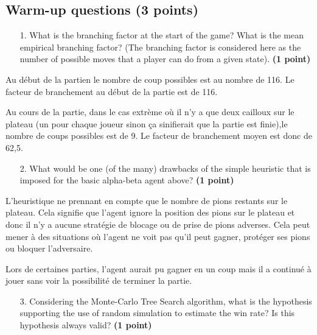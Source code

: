 \documentclass[11pt,a4paper]{report}
\begin{document}
\subsection{Warm-up questions (3 points)}
\begin{enumerate}
\item[1.] What is the branching factor at the start of the game? What is the mean empirical branching factor? (The branching factor is considered here as the number of possible moves that a player can do from a given state). \textbf{(1 point)}
\end{enumerate}

\begin{answers}[5cm]
Au début de la partien le nombre de coup possibles est au nombre de 116. Le facteur de branchement au début de la partie est de 116.

Au cours de la partie, dans le cas extrème où il n'y a que deux cailloux sur le plateau (un pour chaque joueur sinon ça sinifierait que la partie est finie),le nombre de coups possibles est de 9. Le facteur de branchement moyen est donc de 62,5.
\end{answers}



\begin{enumerate}
\item[2.] What would be one (of the many) drawbacks of the simple heuristic that is imposed for the basic alpha-beta agent above? \textbf{(1 point)}
\end{enumerate}

\begin{answers}[10cm]
L'heuristique ne prennant en compte que le nombre de pions restants sur le plateau. Cela signifie que l'agent ignore la position des pions sur le plateau et donc il n'y a aucune stratégie de blocage ou de prise de pions adverses. Cela peut mener à des situations où l'agent ne voit pas qu'il peut gagner, protéger ses pions ou bloquer l'adversaire. 

Lors de certaines parties, l'agent aurait pu gagner en un coup mais il a continué à jouer sans voir la possibilité de terminer la partie.
\end{answers}



\begin{enumerate}
\item[3.] Considering the Monte-Carlo Tree Search algorithm, what is the hypothesis supporting the use of random simulation to estimate the win rate? Is this hypothesis always valid? \textbf{(1 point)}
\end{enumerate}
\end{document}
